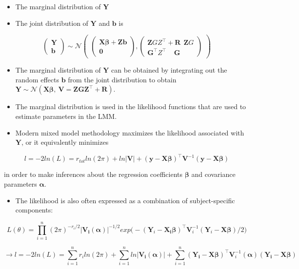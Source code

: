 \documentclass[
  9pt,
  ignorenonframetext,
]{beamer}
\providecommand{\tightlist}{%
  \setlength{\itemsep}{0pt}\setlength{\parskip}{0pt}}
\begin{document}
\begin{frame}{}
\protect\hypertarget{section-7}{}
\begin{itemize}
\item
  The marginal distribution of \(\pmb Y\)
\item
  The joint distribution of \(\pmb Y\) and \(\pmb b\) is
\end{itemize}

\[
\begin{pmatrix}
\pmb Y\\ \pmb b
\end{pmatrix} \sim \mathcal N
\begin{pmatrix}
\begin{pmatrix}
\pmb {X\beta} +\pmb {Zb}\\ \pmb 0
\end{pmatrix},
\begin{pmatrix}
\pmb ZGZ^{\top} +\pmb R\ \ \pmb ZG\\ \pmb G^{\top}Z^{\top}\ \ \ \ \  \pmb G
\end{pmatrix}
\end{pmatrix}
\]

\begin{itemize}
\item
  The marginal distribution of \(\pmb Y\) can be obtained by integrating
  out the random effects \(\pmb b\) from the joint distribution to
  obtain
  \(\pmb Y \sim \mathcal N (\pmb {X\beta},\ \pmb V = \pmb {ZGZ}^{\top} + \pmb R)\).
\item
  The marginal distribution is used in the likelihood functions that are
  used to estimate parameters in the LMM.
\end{itemize}
\end{frame}

\begin{frame}{}
\protect\hypertarget{section-8}{}
\begin{itemize}
\tightlist
\item
  Modern mixed model methodology maximizes the likelihood associated
  with \(\pmb Y\), or it equivalently minimizes
\end{itemize}

\[
l = -2ln(L) = r_{tot}ln(2\pi) + ln |\pmb V| + 
\pmb {(y-X\beta)}^{\top}\pmb V^{-1} \pmb {(y-X\beta)}
\]

in order to make inferences about the regression coefficients
\(\pmb \beta\) and covariance parameters \(\pmb \alpha\).

\begin{itemize}
\tightlist
\item
  The likelihood is also often expressed as a combination of
  subject-specific components:
\end{itemize}

\[
L(\theta)=\prod_{i=1}^n{(2\pi)^{-r_i/2} |\pmb {V_i (\alpha)} |^{-1/2} exp \big(-(\pmb Y_i - \pmb {X_i \beta} )^{\top} \pmb V_i^{-1} (\pmb Y_i - \pmb {X\beta})/2 \big)}
\]

\[
\rightarrow l =-2ln(L)=\sum_{i=1}^n r_i ln(2π) + \sum_{i=1}^n ln|\pmb {V_i (α)}| + \sum_{i=1}^n (\pmb {Y_i-X\beta})^{\top} \pmb V_i^{-1} (\pmb \alpha)(\pmb {Y_i-X\beta}) 
\]
\end{frame}
\end{document}
